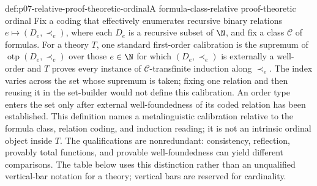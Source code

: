 \begin{hbdefinition}{def:p07-relative-proof-theoretic-ordinal}{A formula-class-relative proof-theoretic ordinal}
Fix a coding that effectively enumerates recursive binary relations
\(e\mapsto(D_e,\prec_e)\), where each \(D_e\) is a recursive subset of
\(\N\), and fix a class \(\mathcal C\) of formulas.  For a theory \(T\), one
standard first-order calibration is the supremum of
\(\operatorname{otp}(D_e,\prec_e)\) over those \(e\in\N\) for which
\((D_e,\prec_e)\) is externally a well-order and \(T\) proves every instance
of \(\mathcal C\)-transfinite induction along \(\prec_e\).
The index varies across the set whose supremum is taken; fixing one relation
and then reusing it in the set-builder would not define this calibration.  An
order type enters the set only after external well-foundedness of its coded
relation has been established.  This definition names a metalinguistic
calibration relative to the formula class, relation coding, and induction
reading; it is not an intrinsic ordinal object inside \(T\).  The
qualifications are nonredundant: consistency, reflection, provably total
functions, and provable well-foundedness can yield different comparisons.
The table below uses this distinction rather than an unqualified vertical-bar
notation for a theory; vertical bars are reserved for cardinality.
\end{hbdefinition}

